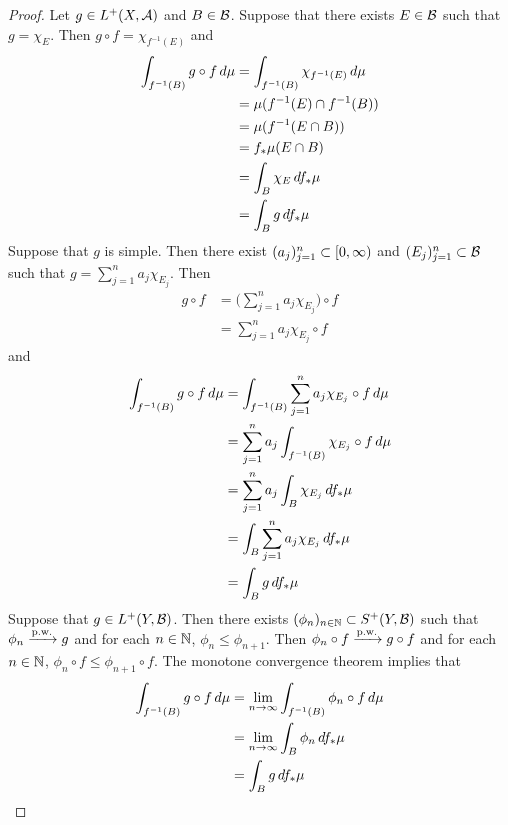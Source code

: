 \documentclass{book}
\begin{document}
	\begin{proof}
		Let $g \in  L^+(X, \mathcal{A})$ and $B \in \mathcal{B}$. Suppose that there exists $E \in \mathcal{B}$ such that $g = \chi_E$. Then $g \circ f = \chi_{f^{-1}(E)}$ and
		\begin{align*}
			\int_{f^{-1}(B)} g \circ f \, d \mu
			& = \int_{f^{-1}(B)} \chi_{f^{-1}(E)} \, d \mu \\
			& = \mu(f^{-1}(E) \cap f^{-1}(B)) \\
			& = \mu( f^{-1}(E \cap B)) \\
			& = f_*\mu (E \cap B) \\
			& = \int_{B} \chi_{E} \, df_*\mu \\
			& = \int_{B} g \, df_*\mu 
 		\end{align*}
 		Suppose that $g$ is simple. Then there exist $(a_j)_{j=1}^n \subset [0,\infty)$ and $(E_j)_{j=1}^n \subset \mathcal{B}$ such that $g = \sum\limits_{j=1}^n a_j \chi_{E_j}$. 
 		Then 
 		\begin{align*}
 			g \circ f 
 			& = \bigg( \sum\limits_{j=1}^n a_j \chi_{E_j} \bigg) \circ f\\
 			& = \sum\limits_{j=1}^n a_j \chi_{E_j} \circ f
 		\end{align*}
 		and 
 		\begin{align*}
 			\int_{f^{-1}(B)} g \circ f \, d \mu
 			& = \int_{f^{-1}(B)} \sum\limits_{j=1}^n a_j \chi_{E_j} \circ f \, d \mu \\
 			& = \sum_{j=1}^n a_j \int_{f^{-1}(B)} \chi_{E_j} \circ f \, d \mu \\
 			& = \sum_{j=1}^n a_j \int_{B} \chi_{E_j} \, d f_*\mu \\
 			& = \int_{B} \sum_{j=1}^n a_j  \chi_{E_j} \, d f_*\mu \\
 			& = \int_{B} g \, d f_*\mu \\
 		\end{align*}
 		Suppose that $g \in L^+(Y, \mathcal{B})$. Then there exists $(\phi_n)_{n \in \mathbb{N}} \subset S^+(Y, \mathcal{B})$ such that $\phi_n \xrightarrow{\text{p.w.}} g$ and for each $n \in \mathbb{N}$, $\phi_n \leq \phi_{n+1}$. Then $\phi_n \circ f \xrightarrow{\text{p.w.}} g \circ f$ and for each $n \in \mathbb{N}$, $\phi_n \circ f \leq \phi_{n+1} \circ f$. The monotone convergence theorem implies that 
 		\begin{align*}
 			\int_{f^{-1}(B)} g \circ f \, d \mu
 			& = \lim \limits_{n \rightarrow \infty} \int_{f^{-1}(B)} \phi_n \circ f \, d \mu \\
 			& = \lim \limits_{n \rightarrow \infty} \int_{B} \phi_n \, d f_*\mu \\
 			& = \int_{B} g \, d f_*\mu \\
 		\end{align*}
	\end{proof}
\end{document}
